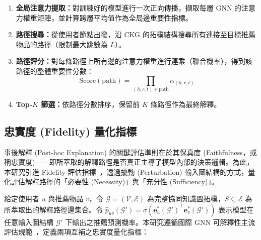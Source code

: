 \begin{enumerate}[leftmargin=2em]
  \item \textbf{全局注意力提取：}對訓練好的模型進行一次正向傳播，擷取每層 GNN 的注意力權重矩陣，並計算跨層平均值作為全局邊重要性指標。
  \item \textbf{路徑搜尋：}從使用者節點出發，沿 CKG 的拓樸結構搜尋所有連接至目標推薦物品的路徑（限制最大跳數為 $L$）。
  \item \textbf{路徑評分：}對每條路徑上所有邊的注意力權重進行連乘（聯合機率），得到該路徑的整體重要性分數：
    \begin{equation}
      \text{Score}(\text{path}) = \prod_{(h,r,t) \in \text{path}} \alpha_{(h,r,t)}
      \label{eq:path_score}
    \end{equation}
  \item \textbf{Top-$K$ 篩選：}依路徑分數排序，保留前 $K$ 條路徑作為最終解釋。
\end{enumerate}

\subsection*{忠實度 (Fidelity) 量化指標}

事後解釋 (Post-hoc Explanation) 的關鍵評估準則在於其保真度 (Faithfulness，或稱忠實度)——即所萃取的解釋路徑是否真正主導了模型內部的決策邏輯。為此，本研究引進 Fidelity 評估指標~\cite{agarwal2023evaluating, agarwal2024fidelity, yuan2022explainability}，透過擾動 (Perturbation) 輸入圖結構的方式，量化評估解釋路徑的「必要性 (Necessity)」與「充分性 (Sufficiency)」。

給定使用者 $u$ 與推薦物品 $v$，令 $\mathcal{G} = (\mathcal{V}, \mathcal{E})$ 為完整協同知識圖拓樸，$S \subseteq \mathcal{E}$ 為所萃取出的解釋路徑邊集合。令 $\hat{p}_{uv}(\mathcal{G}') = \sigma({\mathbf{e}_u^*(\mathcal{G}')}^\top \mathbf{e}_v^*(\mathcal{G}'))$ 表示模型在任意輸入圖結構 $\mathcal{G}'$ 下輸出之推薦預測機率。本研究遵循國際 GNN 可解釋性主流評估規範~\cite{agarwal2023evaluating, agarwal2024fidelity, yuan2022explainability}，定義兩項互補之忠實度量化指標：


